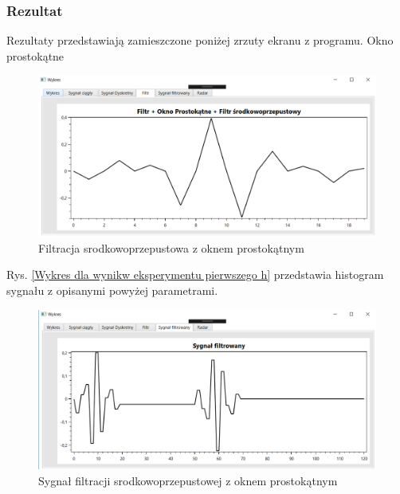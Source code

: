 \documentclass[12pt]{article}
\begin{document}
\subsubsection{Rezultat}

Rezultaty przedstawiają zamieszczone poniżej zrzuty ekranu z programu. 
\newpage
Okno prostokątne
\begin{figure}[h!]
 \centering
 \includegraphics[width=12.3cm]{prostFSOP.PNG}
 \vspace{-0.3cm}
 \caption{Filtracja srodkowoprzepustowa z oknem prostokątnym}
 \label{Wykres dla wyników eksperymentu drugiego}
\end{figure}
\newpage
Rys. \ref{Wykres dla wynikw eksperymentu pierwszego h} przedstawia histogram sygnału z opisanymi powyżej parametrami. 
\begin{figure}[h!]
 \centering
 \includegraphics[width=12.3cm]{prostSFSP.PNG}
 \vspace{-0.3cm}
 \caption{Sygnał filtracji srodkowoprzepustowej z oknem prostokątnym}
 \label{Histogram dla wyników eksperymentu drugiego}
\end{figure}
\end{document}
